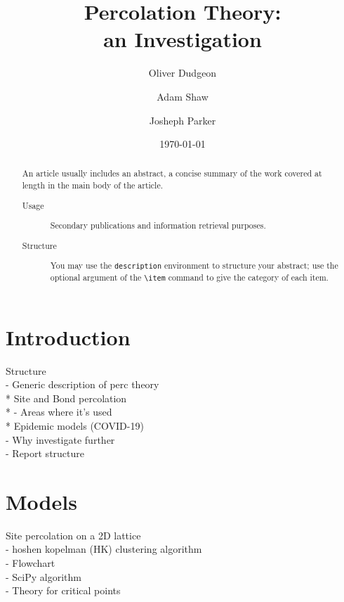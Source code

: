 \documentclass[%
 reprint,
 amsmath,amssymb,
 aps,
]{revtex4-2}
\begin{document}

\title{Percolation Theory:\\an Investigation}%

\author{Oliver Dudgeon}
\author{Adam Shaw}
\author{Josheph Parker}

\date{\today}

\begin{abstract}
An article usually includes an abstract, a concise summary of the work
covered at length in the main body of the article. 
\begin{description}
\item[Usage]
Secondary publications and information retrieval purposes.
\item[Structure]
You may use the \texttt{description} environment to structure your abstract;
use the optional argument of the \verb+\item+ command to give the category of each item. 
\end{description}
\end{abstract}

\maketitle

\section{Introduction}
Structure\\
- Generic description of perc theory\\
* Site and Bond percolation\\
* 
- Areas where it's used\\
    * Epidemic models (COVID-19)\\
- Why investigate further\\
- Report structure\\

\section{Models}
Site percolation on a 2D lattice\\
- hoshen kopelman (HK) clustering algorithm\\
- Flowchart\\
- SciPy algorithm\\
- Theory for critical points\\
\end{document}
